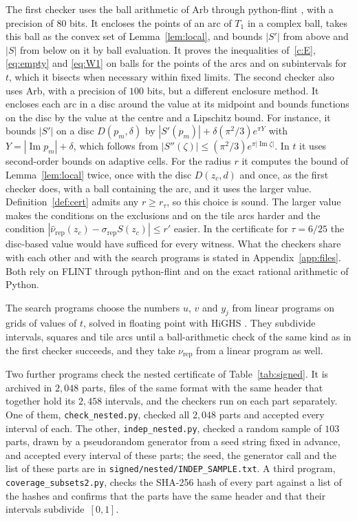 \documentclass[11pt]{amsart}
\theoremstyle{definition}
\theoremstyle{remark}
\numberwithin{equation}{section}
\newcommand{\im}{\operatorname{Im}}
\newcommand{\QIndepM}{103}
\begin{document}
The first checker uses the ball arithmetic of Arb \cite{Joh17} through python-flint \cite{pyflint}, with a precision of $80$ bits. It encloses the points of an arc of $T_1$ in a complex ball, takes this ball as the convex set of Lemma~\ref{lem:local}, and bounds $|S'|$ from above and $|S|$ from below on it by ball evaluation. It proves the inequalities of~\ref{c:E}, \eqref{eq:empty} and \eqref{eq:W1} on balls for the points of the arcs and on subintervals for $t$, which it bisects when necessary within fixed limits. The second checker also uses Arb, with a precision of $100$ bits, but a different enclosure method. It encloses each arc in a disc around the value at its midpoint and bounds functions on the disc by the value at the centre and a Lipschitz bound. For instance, it bounds $|S'|$ on a disc $D(p_m,\delta)$ by $|S'(p_m)|+\delta(\pi^2/3)e^{\pi Y}$ with $Y=|\im p_m|+\delta$, which follows from $|S''(\zeta)|\le(\pi^2/3)e^{\pi|\im\zeta|}$. In $t$ it uses second-order bounds on adaptive cells. For the radius $r$ it computes the bound of Lemma~\ref{lem:local} twice, once with the disc $D(z_c,d)$ and once, as the first checker does, with a ball containing the arc, and it uses the larger value. Definition~\ref{def:cert} admits any $r\ge r_\tau$, so this choice is sound. The larger value makes the conditions on the exclusions and on the tile arcs harder and the condition $|\hat\nu_{\mathrm{rep}}(z_c)-\sigma_{\mathrm{rep}}S(z_c)|\le r'$ easier. In the certificate for $\tau=6/25$ the disc-based value would have sufficed for every witness. What the checkers share with each other and with the search programs is stated in Appendix~\ref{app:files}. Both rely on FLINT through python-flint and on the exact rational arithmetic of Python.

The search programs choose the numbers $u$, $v$ and $y_j$ from linear programs on grids of values of $t$, solved in floating point with HiGHS \cite{HiGHS}. They subdivide intervals, squares and tile arcs until a ball-arithmetic check of the same kind as in the first checker succeeds, and they take $\nu_{\mathrm{rep}}$ from a linear program as well.

Two further programs check the nested certificate of Table~\ref{tab:signed}. It is archived in $2{,}048$ parts, files of the same format with the same header that together hold its $2{,}458$ intervals, and the checkers run on each part separately. One of them, \texttt{check\_nested.py}, checked all $2{,}048$ parts and accepted every interval of each. The other, \texttt{indep\_nested.py}, checked a random sample of $\QIndepM$ parts, drawn by a pseudorandom generator from a seed string fixed in advance, and accepted every interval of these parts; the seed, the generator call and the list of these parts are in \texttt{signed/nested/INDEP\_SAMPLE.txt}. A third program, \texttt{coverage\_subsets2.py}, checks the SHA-256 hash of every part against a list of the hashes and confirms that the parts have the same header and that their intervals subdivide~$[0,1]$.
\end{document}
